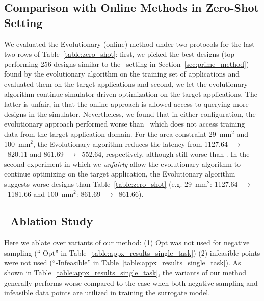 \subsection{Comparison with Online Methods in Zero-Shot Setting}
\label{sec:app_zero_shot}
%
We evaluated the Evolutionary (online) method under two protocols for the last two rows of Table~\ref{table:zero_shot}: first, we picked the best designs (top-performing 256 designs similar to the \primemethodname\ setting in Section~\ref{sec:prime_method}) found by the evolutionary algorithm on the training set of applications and evaluated them on the target applications and second, we let the evolutionary algorithm continue simulator-driven optimization on the target applications.
%
The latter is unfair, in that the online approach is allowed access to querying more designs in the simulator. Nevertheless, we found that in either configuration, the evolutionary approach performed worse than \primemethodname\, which does not access training data from the target application domain.
%
For the area constraint 29~mm$^2$ and 100~mm$^2$, the Evolutionary algorithm reduces the latency from 1127.64~$\rightarrow$~820.11 and 861.69~$\rightarrow$~552.64, respectively, although still worse than \primemethodname.
%
In the second experiment in which we \emph{unfairly} allow the evolutionary algorithm to continue optimizing on the target application, the Evolutionary algorithm suggests worse designs than Table~\ref{table:zero_shot} (e.g. 29~mm$^2$: 1127.64~$\rightarrow$~1181.66 and 100~mm$^2$: 861.69~$\rightarrow$~861.66).
%


\subsection{\primemethodname\ Ablation Study}
\label{sec:appx_ablation}



Here we ablate over variants of our method: (1) $\mathrm{Opt}$ was not used for negative sampling (``\primemethodname-$\mathrm{Opt}$'' in Table~\ref{table:appx_results_single_task}) (2)  infeasible points were not used (``\primemethodname-Infeasible'' in Table~\ref{table:appx_results_single_task}).
%
As shown in Table~\ref{table:appx_results_single_task}, the variants of our method generally performs worse compared to the case when both negative sampling and infeasible data points are utilized in training the surrogate model.

